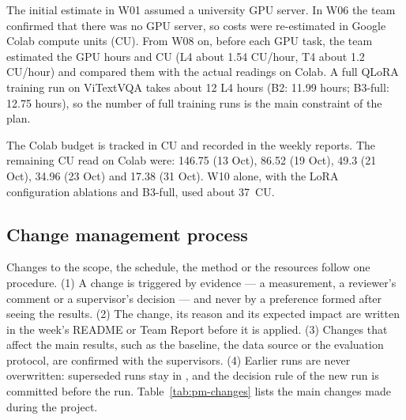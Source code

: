 The initial estimate in W01 assumed a university GPU server. In W06 the team confirmed that
there was no GPU server, so costs were re-estimated in Google Colab compute units (CU). From
W08 on, before each GPU task, the team estimated the GPU hours and CU (L4 about 1.54 CU/hour,
T4 about 1.2 CU/hour) and compared them with the actual readings on Colab. A full QLoRA
training run on ViTextVQA takes about 12 L4 hours (B2: 11.99 hours; B3-full: 12.75 hours), so
the number of full training runs is the main constraint of the plan.

The Colab budget is tracked in CU and recorded in the weekly reports. The remaining CU read on
Colab were: 146.75 (13 Oct), 86.52 (19 Oct), 49.3 (21 Oct), 34.96 (23 Oct) and 17.38 (31 Oct).
W10 alone, with the LoRA configuration ablations and B3-full, used about 37~CU.

\subsection{Change management process}
\label{sec:pm-change}

Changes to the scope, the schedule, the method or the resources follow one procedure.
(1) A change is triggered by evidence --- a measurement, a reviewer's comment or a
supervisor's decision --- and never by a preference formed after seeing the results.
(2) The change, its reason and its expected impact are written in the week's README or Team
Report before it is applied. (3) Changes that affect the main results, such as the baseline,
the data source or the evaluation protocol, are confirmed with the supervisors. (4) Earlier
runs are never overwritten: superseded runs stay in , and the decision
rule of the new run is committed before the run. Table~\ref{tab:pm-changes} lists the main
changes made during the project.

